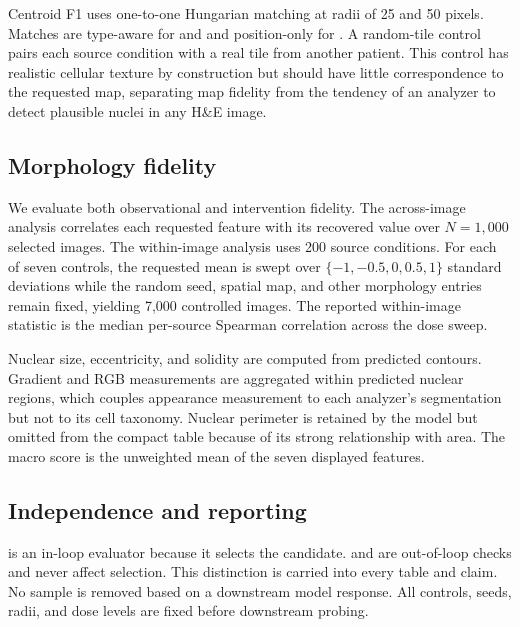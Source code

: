 Centroid F1 uses one-to-one Hungarian matching at radii of 25 and 50 pixels. Matches are type-aware for \cellvit{} and \hovernet{} and position-only for \stardist{}. A random-tile control pairs each source condition with a real tile from another patient. This control has realistic cellular texture by construction but should have little correspondence to the requested map, separating map fidelity from the tendency of an analyzer to detect plausible nuclei in any H\&E image.

\subsection{Morphology fidelity}

We evaluate both observational and intervention fidelity. The across-image analysis correlates each requested feature with its recovered value over $N=1{,}000$ selected images. The within-image analysis uses 200 source conditions. For each of seven controls, the requested mean is swept over $\{-1,-0.5,0,0.5,1\}$ standard deviations while the random seed, spatial map, and other morphology entries remain fixed, yielding 7,000 controlled images. The reported within-image statistic is the median per-source Spearman correlation across the dose sweep.

Nuclear size, eccentricity, and solidity are computed from predicted contours. Gradient and RGB measurements are aggregated within predicted nuclear regions, which couples appearance measurement to each analyzer's segmentation but not to its cell taxonomy. Nuclear perimeter is retained by the model but omitted from the compact table because of its strong relationship with area. The macro score is the unweighted mean of the seven displayed features.

\subsection{Independence and reporting}

\cellvit{} is an in-loop evaluator because it selects the candidate. \hovernet{} and \stardist{} are out-of-loop checks and never affect selection. This distinction is carried into every table and claim. No sample is removed based on a downstream model response. All controls, seeds, radii, and dose levels are fixed before downstream probing.
